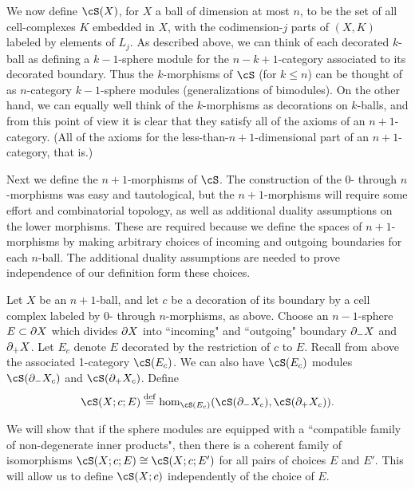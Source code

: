 We now define $\cS(X)$, for $X$ a ball of dimension at most $n$, to be the set of all 
cell-complexes $K$ embedded in $X$, with the codimension-$j$ parts of $(X, K)$ labeled
by elements of $L_j$.
As described above, we can think of each decorated $k$-ball as defining a $k{-}1$-sphere module
for the $n{-}k{+}1$-category associated to its decorated boundary.
Thus the $k$-morphisms of $\cS$ (for $k\le n$) can be thought 
of as $n$-category $k{-}1$-sphere modules 
(generalizations of bimodules).
On the other hand, we can equally well think of the $k$-morphisms as decorations on $k$-balls, 
and from this point of view it is clear that they satisfy all of the axioms of an
$n{+}1$-category.
(All of the axioms for the less-than-$n{+}1$-dimensional part of an $n{+}1$-category, that is.)

\medskip

Next we define the $n{+}1$-morphisms of $\cS$.
The construction of the 0- through $n$-morphisms was easy and tautological, but the 
$n{+}1$-morphisms will require some effort and combinatorial topology, as well as additional
duality assumptions on the lower morphisms. These are required because we define the spaces of $n{+}1$-morphisms by making arbitrary choices of incoming and outgoing boundaries for each $n$-ball. The additional duality assumptions are needed to prove independence of our definition form these choices.

Let $X$ be an $n{+}1$-ball, and let $c$ be a decoration of its boundary
by a cell complex labeled by 0- through $n$-morphisms, as above.
Choose an $n{-}1$-sphere $E\subset \partial X$ which divides
$\partial X$ into ``incoming" and ``outgoing" boundary $\partial_-X$ and $\partial_+X$.
Let $E_c$ denote $E$ decorated by the restriction of $c$ to $E$.
Recall from above the associated 1-category $\cS(E_c)$.
We can also have $\cS(E_c)$ modules $\cS(\bd_-X_c)$ and $\cS(\bd_+X_c)$.
Define
\[
	\cS(X; c; E) \deq \hom_{\cS(E_c)}(\cS(\bd_-X_c), \cS(\bd_+X_c)) .
\]

We will show that if the sphere modules are equipped with a ``compatible family of 
non-degenerate inner products", then there is a coherent family of isomorphisms
$\cS(X; c; E) \cong \cS(X; c; E')$ for all pairs of choices $E$ and $E'$.
This will allow us to define $\cS(X; c)$ independently of the choice of $E$.

